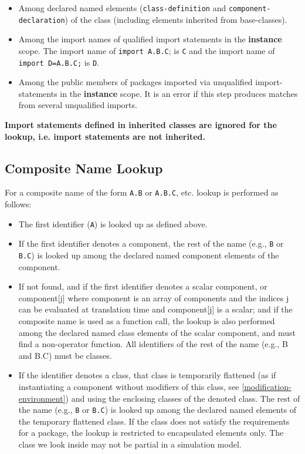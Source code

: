 \begin{itemize}
\item
  Among declared named elements (\lstinline!class-definition! and
  \lstinline!component-declaration!) of the class (including elements inherited from
  base-classes).
\item
  Among the import names of qualified import statements in the
  \textbf{instance} scope. The import name of \lstinline!import A.B.C!; is \lstinline!C! and the
  import name of \lstinline!import D=A.B.C;! is \lstinline!D!.
\item
  Among the public members of packages imported via unqualified
  import-statements in the \textbf{instance} scope. It is an error if
  this step produces matches from several unqualified imports.
\end{itemize}

\textbf{Import statements defined in inherited classes are ignored for
the lookup, i.e. import statements are not inherited.}

\subsection{Composite Name Lookup}

For a composite name of the form \lstinline!A.B! or \lstinline!A.B.C!, etc. lookup is performed
as follows:
\begin{itemize}
\item
  The first identifier (\lstinline!A!) is looked up as defined above.
\item
  If the first identifier denotes a component, the rest of the name
  (e.g., \lstinline!B! or \lstinline!B.C!) is looked up among the declared named component
  elements of the component.
\item
  If not found, and if the first identifier denotes a scalar component,
  or component[j] where component is an array of components and the
  indices j can be evaluated at translation time and component[j] is
  a scalar; and if the composite name is used as a function call, the
  lookup is also performed among the declared named class elements of
  the scalar component, and must find a non-operator function. All
  identifiers of the rest of the name (e.g., B and B.C) must be
  classes.
\item
  If the identifier denotes a class, that class is temporarily flattened
  (as if instantiating a component without modifiers of this class, see
  \autoref{modification-environment}) and using the enclosing classes of the denoted class.
  The rest of the name (e.g., \lstinline!B! or \lstinline!B.C!) is looked up among the
  declared named elements of the temporary flattened class. If the class
  does not satisfy the requirements for a package, the lookup is
  restricted to encapsulated elements only. The class we look inside may
  not be partial in a simulation model.
\end{itemize}

